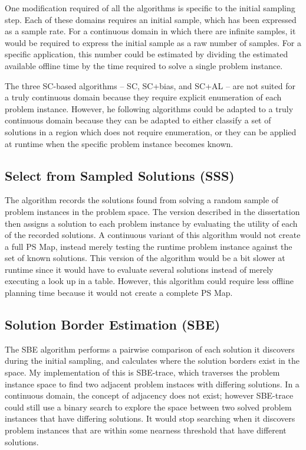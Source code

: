 One modification required of all the algorithms is specific to the initial sampling step.  Each of these domains requires an initial sample, which has been expressed as a sample rate.  For a continuous domain in which there are infinite samples, it would be required to express the initial sample as a raw number of samples.  For a specific application, this number could be estimated by dividing the estimated available offline time by the time required to solve a single problem instance.


 The three SC-based algorithms -- SC, SC+bias, and SC+AL -- are not suited for a truly continuous domain because they require explicit enumeration of each problem instance.  However, he following algorithms could be adapted to a truly continuous domain because they can be adapted to either classify a set of solutions in a region which does not require enumeration, or they can be applied at runtime when the specific problem instance becomes known.


\subsection{Select from Sampled Solutions (SSS)}
The algorithm records the solutions found from solving a random sample of problem instances in the problem space.  The version described in the dissertation then assigns a solution to each problem instance by evaluating the utility of each of the recorded solutions.  A continuous variant of this algorithm would not create a full PS Map, instead merely testing the runtime problem instance against the set of known solutions.  This version of the algorithm would be a bit slower at runtime since it would have to evaluate several solutions instead of merely executing a look up in a table.  However, this algorithm could require less offline planning time because it would not create a complete PS Map.


\subsection{Solution Border Estimation (SBE)}
The SBE algorithm performs a pairwise comparison of each solution it discovers during the initial sampling, and calculates where the solution borders exist in the space.  My implementation of this is SBE-trace, which traverses the problem instance space to find two adjacent problem instaces with differing solutions.  In a continuous domain, the concept of adjacency does not exist; however SBE-trace could still use a binary search to explore the space between two solved problem instances that have differing solutions.  It would stop searching when it discovers problem instances that are within some nearness threshold that have different solutions.

